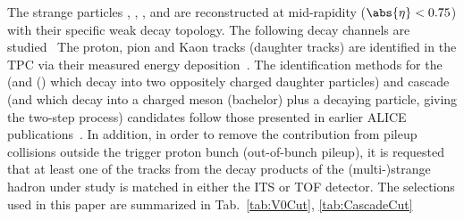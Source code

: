 The strange particles \kzero, \lmb, \almb, \Xis and \Oms are reconstructed at mid-rapidity ($\abs{\eta} < 0.75$) with their specific weak decay topology.
The following decay channels are studied~\cite{PhysRevD.98.030001}
The proton, pion and Kaon tracks (daughter tracks) are identified in the TPC via their measured energy deposition~\cite{Abelev:2014ffa}.
The identification methods for the \Vzero (\kzero and \lmb (\almb) which decay into two oppositely charged daughter particles) and cascade (\Xis and \Oms which decay into a charged meson (bachelor) plus a \Vzero decaying particle, giving the two-step process) candidates follow those presented in earlier ALICE publications~\cite{Aamodt:2011zza, Abelev:2012jp, Acharya:2018orn, Abelev:2013haa, Acharya:2020uxl, Acharya:2019kyh}.
In addition, in order to remove the contribution from pileup collisions outside the trigger proton bunch (out-of-bunch pileup), it is requested that at least one of the tracks from the decay products of the (multi-)strange hadron under study is matched in either the ITS or TOF detector.
The selections used in this paper are summarized in Tab.~\ref{tab:V0Cut}, \ref{tab:CascadeCut}

